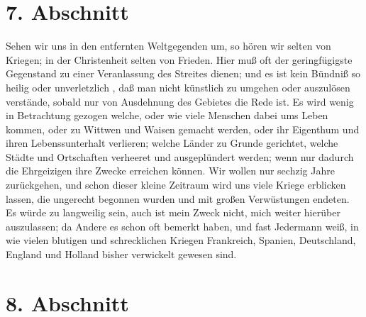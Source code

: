 \section{7. Abschnitt} \label{kap8_ab7}

Sehen wir uns in den entfernten Weltgegenden um, so hören wir selten von
Kriegen; in der Christenheit selten von Frieden. Hier muß oft der geringfügigste
Gegenstand zu einer Veranlassung des Streites dienen; und es ist kein Bündniß so
heilig oder unverletzlich , daß man nicht künstlich zu umgehen oder auszulösen
verstände, sobald nur von Ausdehnung des Gebietes die Rede ist. Es wird wenig in
Betrachtung gezogen welche, oder wie viele Menschen dabei ums Leben kommen, oder
zu Wittwen und Waisen gemacht werden, oder ihr Eigenthum und ihren
Lebenssunterhalt verlieren; welche Länder zu Grunde gerichtet, welche Städte und
Ortschaften verheeret und ausgeplündert werden; wenn nur dadurch die Ehrgeizigen
ihre Zwecke erreichen können. Wir wollen nur sechzig Jahre zurückgehen, und
schon dieser kleine Zeitraum wird uns viele Kriege erblicken lassen, die
ungerecht begonnen wurden und mit großen Verwüstungen endeten. Es würde zu
langweilig sein, auch ist mein Zweck nicht, mich weiter hierüber auszulassen; da
Andere es schon oft bemerkt haben, und fast Jedermann weiß, in wie vielen
blutigen und schrecklichen Kriegen Frankreich, Spanien, Deutschland, England und
Holland bisher verwickelt gewesen sind.

\section{8. Abschnitt} \label{kap8_ab8}

